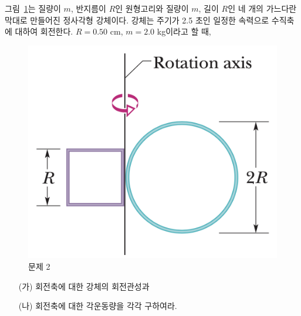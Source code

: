 \documentclass[floatfix,nofootinbib,superscriptaddress,fleqn]{revtex4-2}
\begin{document}
그림~\ref{fig:2}는 질량이 $m$, 반지름이 $R$인 원형고리와 질량이 $m$,
길이 $R$인 네 개의 가느다란 막대로 만들어진 정사각형 강체이다. 강체는
주기가 2.5 초인 일정한 속력으로 수직축에 대하여 회전한다. $R=0.50$ cm,
$m=2.0$ kg이라고 할 때,
\begin{figure}[ht]
  \centering
\includegraphics[scale=0.4]{Qfig14-2-20220427.png}
  \caption{문제 2}
  \label{fig:2}
\end{figure}
\begin{itemize}
\item[(가)] 회전축에 대한 강체의 회전관성과
\item[(나)] 회전축에 대한 각운동량을 각각 구하여라.   
\end{itemize}
\end{document}
